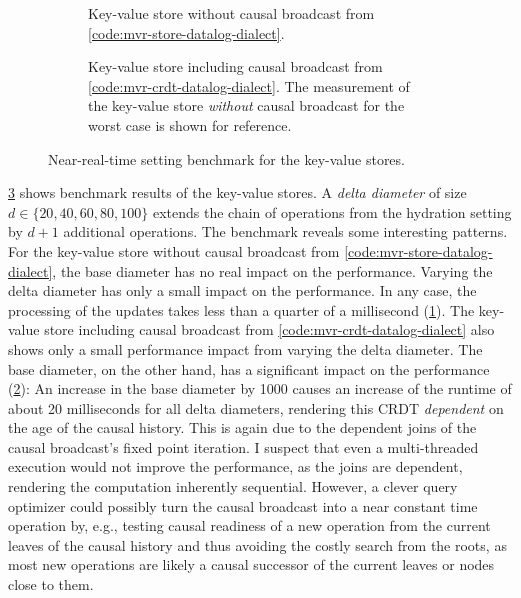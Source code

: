 \begin{figure}[hbt]
    \centering
    \begin{subfigure}[b]{\textwidth}
        \centering
        
        \caption{
            Key-value store without causal broadcast from \ref{code:mvr-store-datalog-dialect}.
        }\label{fig:bench-kv-store-nrt-nocb}
    \end{subfigure}

    \vspace{1em}

    \begin{subfigure}[b]{\textwidth}
        \centering
        
        \caption{
            Key-value store including causal broadcast from \ref{code:mvr-crdt-datalog-dialect}.
            The measurement of the key-value store \emph{without} causal broadcast
            for the worst case
            is shown for reference.
        }\label{fig:bench-kv-store-nrt-cb}
       \end{subfigure}
    \caption{
        Near-real-time setting benchmark for the key-value stores.
    }\label{fig:bench-kv-stores-nrt}
\end{figure}

\ref{fig:bench-kv-stores-nrt} shows benchmark results of the key-value stores.
A \emph{delta diameter} of size \(d \in \{20, 40, 60, 80, 100\}\) extends the
chain of operations from the hydration setting by \(d + 1\) additional operations.
The benchmark reveals some interesting patterns.
For the key-value store without causal broadcast
from \ref{code:mvr-store-datalog-dialect},
the base diameter has no real impact on the performance.
Varying the delta diameter has only a small impact on the performance.
In any case, the processing of the updates takes less than a quarter of a
millisecond (\ref{fig:bench-kv-store-nrt-nocb}).
The key-value store including causal broadcast
from \ref{code:mvr-crdt-datalog-dialect} also shows only a small performance
impact from varying the delta diameter.
The base diameter, on the other hand, has a significant impact on the performance
(\ref{fig:bench-kv-store-nrt-cb}):
An increase in the base diameter by 1000 causes an increase of the runtime of
about 20 milliseconds for all delta diameters,
rendering this \ac{CRDT} \emph{dependent} on the age of the causal history.
This is again due to the dependent joins of the causal broadcast's fixed point
iteration.
I suspect that even a multi-threaded execution would not improve the performance,
as the joins are dependent, rendering the computation inherently sequential.
However, a clever query optimizer could possibly turn the causal broadcast into
a near constant time operation by, e.g., testing causal readiness of a new operation
from the current leaves of the causal history and thus avoiding the
costly search from the roots, as most new operations are likely a causal successor
of the current leaves or nodes close to them.

